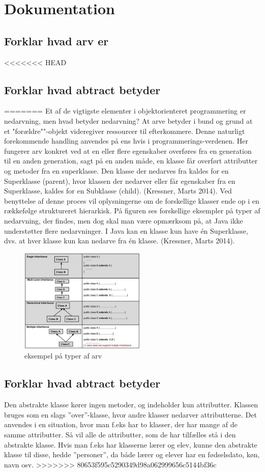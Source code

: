 \section{Dokumentation}
\subsection{Forklar hvad arv er}
<<<<<<< HEAD

\subsection{Forklar hvad abtract betyder}
=======
Et af de vigtigste elementer i objektorienteret programmering er nedarvning, men hvad betyder nedarvning? At arve betyder i bund og grund at et "forældre""-objekt videregiver ressourcer til efterkommere. Denne naturligt forekommende handling anvendes på ens hvis i programmerings-verdenen. Her fungerer arv konkret ved at en eller flere egenskaber overføres fra en generation til en anden generation, sagt på en anden måde, en klasse får overført attributter og metoder fra en superklasse. Den klasse der nedarves fra kaldes for en Superklasse (parent), hvor klassen der nedarver eller får egenskaber fra en Superklasse, kaldes for en Subklasse (child). (Kressner, Marts 2014).
Ved benyttelse af denne proces vil oplysningerne om de forskellige klasser ende op i en rækkefølge struktureret hierarkisk. 
På figuren ses forskellige eksempler på typer af nedarvning, der findes, men dog skal man være opmærksom på, at Java ikke understøtter flere nedarvninger. I Java kan en klasse kun have én Superklasse, dvs. at hver klasse kun kan nedarve fra én klasse. (Kressner, Marts 2014).
\begin{figure}[h]\label{fig:types_of_inheritance.jpg} 
    \advance\leftskip-3cm
    \includegraphics[width=6cm]{fig/types_of_inheritance.jpg}
    \caption{eksempel på typer af arv}
\end{figure}
\subsection{Forklar hvad abtract betyder}
Den abstrakte klasse kører ingen metoder, og indeholder kun attributter. Klassen bruges som en slags ”over”-klasse, hvor andre klasser nedarver attributterne. Det anvendes i en situation, hvor man f.eks har to klasser, der har mange af de samme attributter. Så vil alle de attributter, som de har tilfælles stå i den abstrakte klasse.
Hvis man f.eks har klasserne lærer og elev, kunne den abstrakte klasse til disse, hedde ”personer”, da både lærer og elever har en fødselsdato, køn, navn osv.
>>>>>>> 80653f595c5290349d98a062999656c5144bf36c

